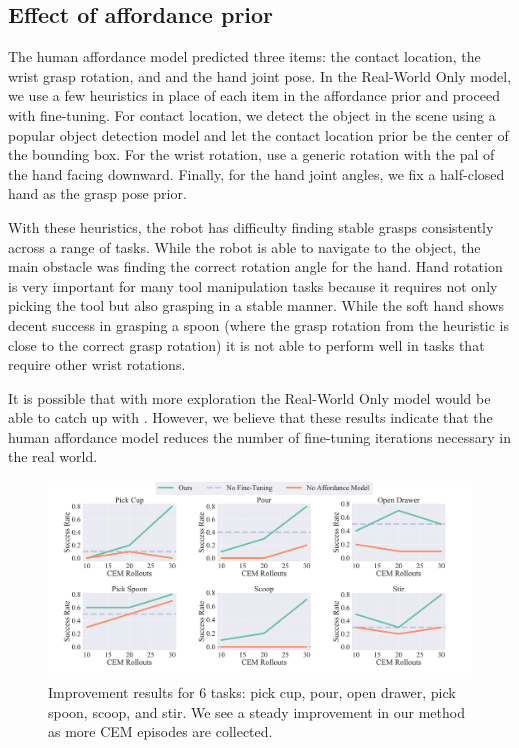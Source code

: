 \subsection{Effect of affordance prior} 
The human affordance model predicted three items: the contact location, the wrist grasp rotation, and and the hand joint pose. In the Real-World Only model, we use a few heuristics in place of each item in the affordance prior and proceed with fine-tuning. For contact location, we detect the object in the scene using a popular object detection model \cite{kirillov2023segment} and let the contact location prior be the center of the bounding box. For the wrist rotation, use a generic rotation with the pal of the hand facing downward. Finally, for the hand joint angles, we fix a half-closed hand as the grasp pose prior.  

With these heuristics, the robot has difficulty finding stable grasps consistently across a range of tasks. While the robot is able to navigate to the object, the main obstacle was finding the correct rotation angle for the hand. Hand rotation is very important for many tool manipulation tasks because it requires not only picking the tool but also grasping in a stable manner. While the soft hand shows decent success in grasping a spoon (where the grasp rotation from the heuristic is close to the correct grasp rotation) it is not able to perform well in tasks that require other wrist rotations.

It is possible that with more exploration the Real-World Only model would be able to catch up with \ours. However, we believe that these results indicate that the human affordance model reduces the number of fine-tuning iterations necessary in the real world.


\begin{figure}[t]
\centering
\includegraphics[width=\linewidth]{figs/graphs_main.pdf}
\vspace{-0.25in}
  \caption{\small Improvement results for 6 tasks: pick cup, pour, open drawer, pick spoon, scoop, and stir. We see a steady improvement in our method as more CEM episodes are collected.
}
 \label{fig:graph_main}
 \vspace{0.1in}
\end{figure}


